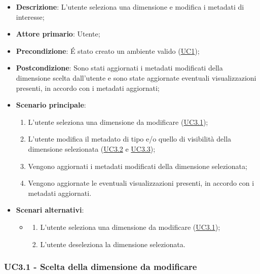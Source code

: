 \begin{itemize}
    \item \textbf{Descrizione}: L’utente seleziona una dimensione e modifica i metadati di interesse;
	
    \item \textbf{Attore primario}: Utente;
    
    \item \textbf{Precondizione}:   É stato creato un ambiente valido (\hyperref[sub:uc1]{UC1});
    \item \textbf{Postcondizione}:  Sono stati aggiornati i metadati modificati della dimensione scelta dall'utente e 
    sono state aggiornate eventuali visualizzazioni presenti, in accordo con i metadati aggiornati;

	\item \textbf{Scenario principale}:
        \begin{enumerate}
                \item L'utente seleziona una dimensione da modificare (\hyperref[ssub:uc3.1]{UC3.1});
                \item L'utente modifica il metadato di tipo e/o quello di visibilità della dimensione selezionata 
                (\hyperref[ssub:uc3.2]{UC3.2} e \hyperref[ssub:uc3.3]{UC3.3});
                \item Vengono aggiornati i metadati modificati della dimensione selezionata;
                \item Vengono aggiornate le eventuali visualizzazioni presenti, in accordo con i metadati 
                aggiornati.
        \end{enumerate}

    \item \textbf{Scenari alternativi}:
    \begin{itemize}
        \item 
        \begin{enumerate}
            \item L'utente seleziona una dimensione da modificare (\hyperref[ssub:uc3.1]{UC3.1});
            \item L'utente deseleziona la dimensione selezionata.
        \end{enumerate}
    \end{itemize}
\end{itemize}

\newpage

\subsubsection{UC3.1 - Scelta della dimensione da modificare}
\label{ssub:uc3.1}

